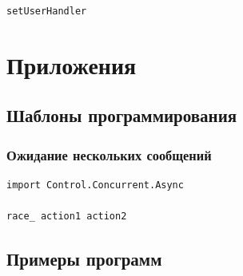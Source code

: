 \documentclass[9pt,a4paper]{article}
\begin{document}
\lstinline!setUserHandler!

\section{Приложения}
\subsection{Шаблоны программирования}
\subsubsection{Ожидание нескольких сообщений}

\begin{lstlisting}
import Control.Concurrent.Async

race_ action1 action2
\end{lstlisting}

\subsection{Примеры программ}
\end{document}
